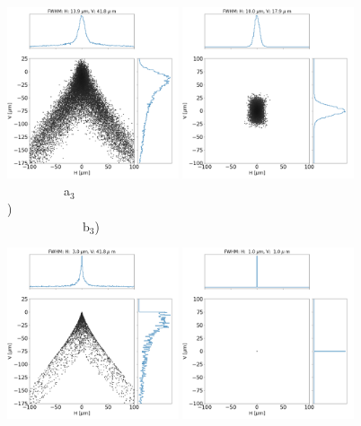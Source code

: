 \documentclass[]{article}
\begin{document}
\begin{figure}
\includegraphics[width=0.45\textwidth]{figures/alsu_toroid.png}
\includegraphics[width=0.45\textwidth]{figures/alsu_diaboloid.png} \\

\flushleft
~~~~~~~~~a$_3$)~~~~~~~~~~~~~~~~~~~~~~~~~~~~~~~~~~~~~~~~~~~~~~~~~~~~~~~~~~~~~~~~~~~~~~~b$_3$) \\
\centering

\includegraphics[width=0.45\textwidth]{figures/bl_point_toroid.png} 
\includegraphics[width=0.45\textwidth]{figures/bl_point_diaboloid-exact.png}  \\
\end{figure}

\end{document}
